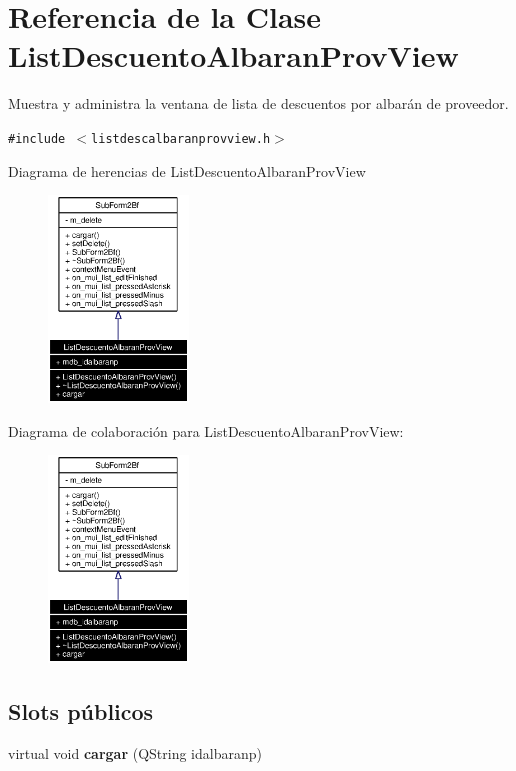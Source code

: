 \section{Referencia de la Clase List\-Descuento\-Albaran\-Prov\-View}
\label{classListDescuentoAlbaranProvView}
Muestra y administra la ventana de lista de descuentos por albar\'{a}n de proveedor.  


{\tt \#include $<$listdescalbaranprovview.h$>$}

Diagrama de herencias de List\-Descuento\-Albaran\-Prov\-View\begin{figure}[H]
\begin{center}
\leavevmode
\includegraphics[width=106pt]{classListDescuentoAlbaranProvView__inherit__graph}
\end{center}
\end{figure}
Diagrama de colaboraci\'{o}n para List\-Descuento\-Albaran\-Prov\-View:\begin{figure}[H]
\begin{center}
\leavevmode
\includegraphics[width=106pt]{classListDescuentoAlbaranProvView__coll__graph}
\end{center}
\end{figure}
\subsection*{Slots p\'{u}blicos}
\begin{CompactItemize}
\item 
virtual void {\bf cargar} (QString idalbaranp)\label{classListDescuentoAlbaranProvView_i0}

\end{CompactItemize}
